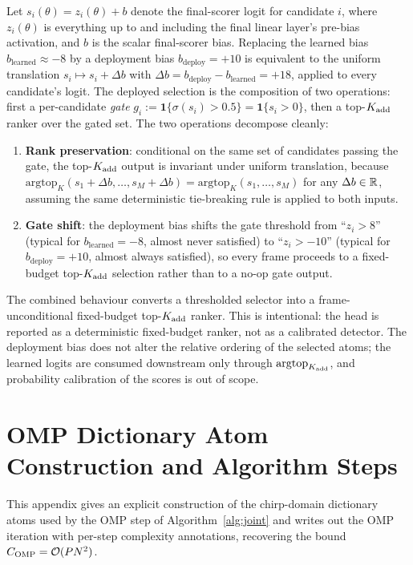 Let $s_i(\theta) = z_i(\theta) + b$ denote the final-scorer logit for candidate $i$, where $z_i(\theta)$ is everything up to and including the final linear layer's pre-bias activation, and $b$ is the scalar final-scorer bias.
Replacing the learned bias $b_{\text{learned}} \approx -8$ by a deployment
bias $b_{\text{deploy}} = +10$ is equivalent to the uniform translation
$s_i \mapsto s_i + \Delta b$ with
$\Delta b = b_{\text{deploy}} - b_{\text{learned}} = +18$, applied to
every candidate's logit.
The deployed selection is the composition of two operations: first a per-candidate \emph{gate} $g_i := \mathbf{1}\{\sigma(s_i) > 0.5\} = \mathbf{1}\{s_i > 0\}$, then a top-$K_{\mathrm{add}}$ ranker over the gated set.
The two operations decompose cleanly:
\begin{enumerate}[leftmargin=*,itemsep=0pt,topsep=2pt]
  \item \textbf{Rank preservation}: conditional on the same set of candidates passing the gate, the top-$K_{\mathrm{add}}$ output is invariant under uniform translation, because $\mathrm{argtop}_K(s_1+\Delta b, \dots, s_M+\Delta b) = \mathrm{argtop}_K(s_1, \dots, s_M)$ for any $\Delta b \in \mathbb{R}$, assuming the same deterministic tie-breaking rule is applied to both inputs.
  \item \textbf{Gate shift}: the deployment bias shifts the gate threshold from ``$z_i > 8$'' (typical for $b_{\text{learned}} = -8$, almost never satisfied) to ``$z_i > -10$'' (typical for $b_{\text{deploy}} = +10$, almost always satisfied), so every frame proceeds to a fixed-budget top-$K_{\mathrm{add}}$ selection rather than to a no-op gate output.
\end{enumerate}
The combined behaviour converts a thresholded selector into a
frame-unconditional fixed-budget top-$K_{\mathrm{add}}$ ranker. This is intentional:
the head is reported as a deterministic fixed-budget ranker, not as a
calibrated detector. The deployment bias does not alter the relative
ordering of the selected atoms; the learned logits are consumed downstream
only through $\mathrm{argtop}_{K_{\mathrm{add}}}$, and probability calibration of the
scores is out of scope.

\section{OMP Dictionary Atom Construction and Algorithm Steps}
\label{app:omp}

This appendix gives an explicit construction of the chirp-domain dictionary
atoms used by the OMP step of Algorithm~\ref{alg:joint} and writes out the
OMP iteration with per-step complexity annotations, recovering the bound
$C_\text{OMP} = \mathcal{O}(P N^2)$.

